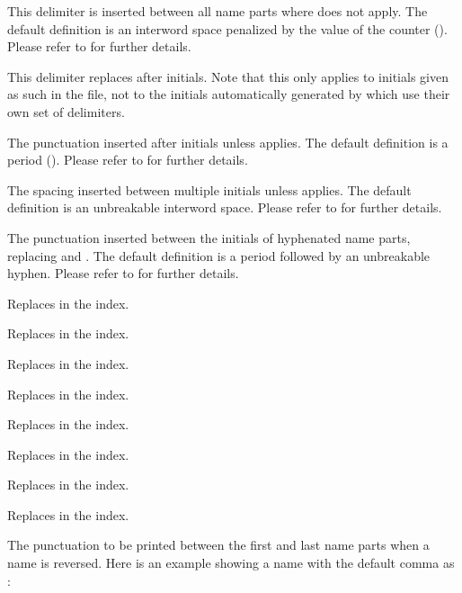 \documentclass{ltxdockit}[2011/03/25]
\begin{document}
\begin{ltxsyntax}
This delimiter is inserted between all name parts where  does not apply. The default definition is an interword space penalized by the value of the  counter (). Please refer to  for further details.

\BiberOnlyMark
This delimiter replaces  after initials. Note that this only applies to initials given as such in the  file, not to the initials automatically generated by  which use their own set of delimiters.

\BiberOnlyMark
The punctuation inserted after initials unless  applies. The default definition is a period (). Please refer to  for further details.

\BiberOnlyMark
The spacing inserted between multiple initials unless  applies. The default definition is an unbreakable interword space. Please refer to  for further details.

\BiberOnlyMark
The punctuation inserted between the initials of hyphenated name parts, replacing  and . The default definition is a period followed by an unbreakable hyphen. Please refer to  for further details.

Replaces  in the index.

Replaces  in the index.

Replaces  in the index.

Replaces  in the index.

Replaces  in the index.

Replaces  in the index.

Replaces  in the index.

Replaces  in the index.

The punctuation to be printed between the first and last name parts when a name is reversed. Here is an example showing a name with the default comma as :


\end{ltxsyntax}
\end{document}

